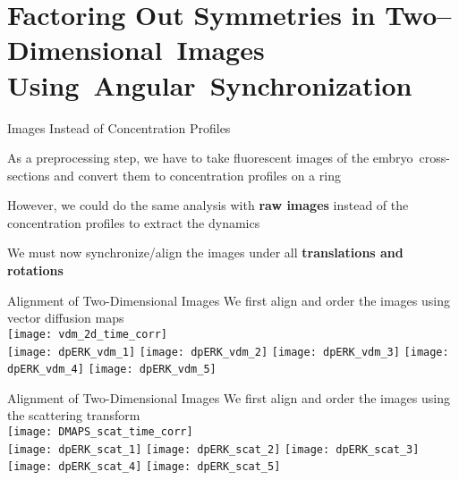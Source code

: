 \section[Unaligned 2-D Images and Angular Synchronization]{Factoring Out Symmetries in Two--Dimensional~Images Using~Angular~Synchronization}

\begin{frame}{Images Instead of Concentration Profiles}
	
	\centering
    As a preprocessing step, we have to take fluorescent images of the embryo~cross-sections and convert them to concentration profiles on a ring\\
    \centering
    
    However, we could do the same analysis with {\bf raw images} instead of the concentration profiles to extract the dynamics
    
    We must now synchronize/align the images under all {\bf translations and rotations}
    
\end{frame}

\begin{frame}{Alignment of Two-Dimensional Images}
    We first align and order the images using vector diffusion maps\\
    
    \centering
    \texttt{[image: vdm\_2d\_time\_corr]}\\
    \texttt{[image: dpERK\_vdm\_1]}
    \texttt{[image: dpERK\_vdm\_2]}
    \texttt{[image: dpERK\_vdm\_3]}
    \texttt{[image: dpERK\_vdm\_4]}
    \texttt{[image: dpERK\_vdm\_5]}
    
\end{frame}

\begin{frame}{Alignment of Two-Dimensional Images}
    We first align and order the images using the scattering transform\\
    
    \centering
    \texttt{[image: DMAPS\_scat\_time\_corr]}\\
    \texttt{[image: dpERK\_scat\_1]}
    \texttt{[image: dpERK\_scat\_2]}
    \texttt{[image: dpERK\_scat\_3]}
    \texttt{[image: dpERK\_scat\_4]}
    \texttt{[image: dpERK\_scat\_5]}
    
\end{frame}

    
    

    